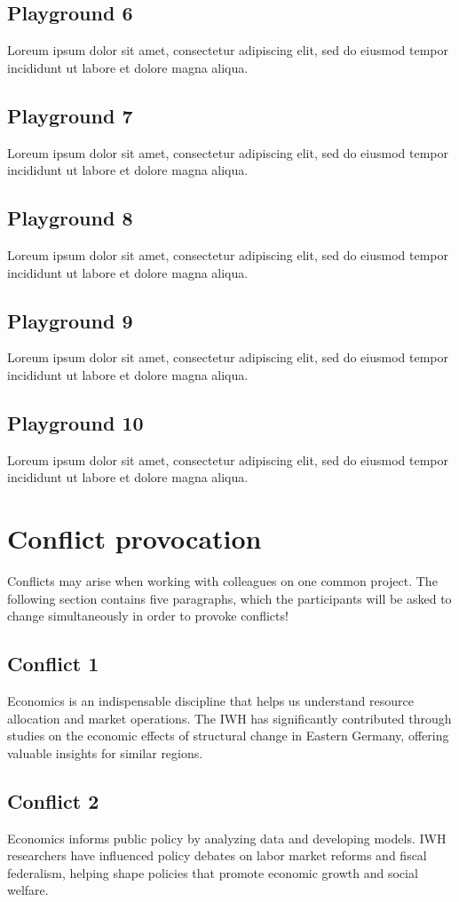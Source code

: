 \documentclass{article}
\begin{document}
\subsection{Playground 6}
Loreum ipsum dolor sit amet, consectetur adipiscing elit, sed do eiusmod tempor incididunt ut labore et dolore magna aliqua.
\subsection{Playground 7}
Loreum ipsum dolor sit amet, consectetur adipiscing elit, sed do eiusmod tempor incididunt ut labore et dolore magna aliqua.
\subsection{Playground 8}
Loreum ipsum dolor sit amet, consectetur adipiscing elit, sed do eiusmod tempor incididunt ut labore et dolore magna aliqua.
\subsection{Playground 9}
Loreum ipsum dolor sit amet, consectetur adipiscing elit, sed do eiusmod tempor incididunt ut labore et dolore magna aliqua.
\subsection{Playground 10}
Loreum ipsum dolor sit amet, consectetur adipiscing elit, sed do eiusmod tempor incididunt ut labore et dolore magna aliqua.




\section{Conflict provocation}
Conflicts may arise when working with colleagues on one common project. The following section contains five paragraphs, which the participants will be asked to change simultaneously in order to provoke conflicts!

\subsection{Conflict 1}
Economics is an indispensable discipline that helps us understand resource allocation and market operations. The IWH has significantly contributed through studies on the economic effects of structural change in Eastern Germany, offering valuable insights for similar regions.

\subsection{Conflict 2}
Economics informs public policy by analyzing data and developing models. IWH researchers have influenced policy debates on labor market reforms and fiscal federalism, helping shape policies that promote economic growth and social welfare.
\end{document}
